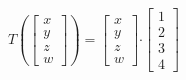 \begin{oppgave}
\begin{punkt}
$T\left( \begin{bmatrix}
x\\
y\\
z\\
w
\end{bmatrix} \right)=\begin{bmatrix}
x\\
y\\
z\\
w
\end{bmatrix}\boldsymbol{\cdot }\begin{bmatrix}
1\\
2\\
3\\
4
\end{bmatrix}$
\end{punkt}



\end{oppgave}

